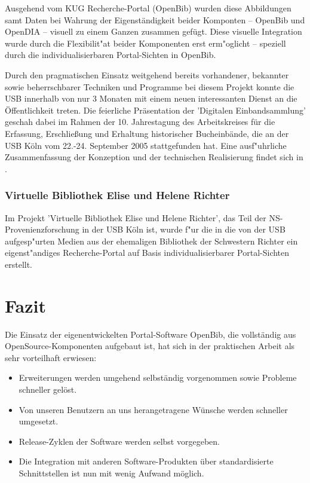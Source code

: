 \documentclass[11pt, twoside, a4paper, BCOR8mm, DIV12, bibtotoc,idxtotoc]{scrbook}
\begin{document}
\begin{itemize}
Ausgehend vom KUG Recherche-Portal (OpenBib) wurden diese Abbildungen
samt Daten bei Wahrung der Eigenständigkeit beider Komponten --
OpenBib und OpenDIA -- visuell zu einem Ganzen zusammen gefügt. Diese
visuelle Integration wurde durch die Flexibilit"at beider Komponenten
erst erm"oglicht -- speziell durch die individualisierbaren
Portal-Sichten in OpenBib. 

Durch den pragmatischen Einsatz weitgehend bereits vorhandener,
bekannter sowie beherrschbarer Techniken und Programme bei diesem
Projekt konnte die USB innerhalb von nur 3 Monaten mit einem neuen
interessanten Dienst an die Öffentlichkeit treten. Die feierliche
Präsentation der 'Digitalen Einbandsammlung' geschah dabei im Rahmen
der 10.  Jahrestagung des Arbeitskreises für die Erfassung,
Erschließung und Erhaltung historischer Bucheinbände, die an der USB
Köln vom 22.-24.  September 2005 stattgefunden hat.  Eine
ausf"uhrliche Zusammenfassung der Konzeption und der technischen
Realisierung findet sich in \cite{BoeFli:EinbandDB}.


\subsubsection{Virtuelle Bibliothek Elise und Helene Richter}

Im Projekt 'Virtuelle Bibliothek Elise und Helene Richter', das Teil
der NS-Provenienzforschung in der USB Köln ist, wurde f"ur die
in die von der USB aufgesp"urten Medien aus der ehemaligen Bibliothek
der Schwestern Richter ein eigenst"andiges Recherche-Portal auf Basis
individualisierbarer Portal-Sichten erstellt.

\section{Fazit}

Die Einsatz der eigenentwickelten Portal-Software OpenBib, die
vollständig aus OpenSource-Komponenten aufgebaut ist, hat sich in der
praktischen Arbeit als sehr vorteilhaft erwiesen:

\begin{itemize}
\item Erweiterungen werden umgehend selbständig vorgenommen sowie
  Probleme schneller gelöst.
\item Von unseren Benutzern an uns herangetragene Wünsche werden
  schneller umgesetzt.
\item Release-Zyklen der Software werden selbst vorgegeben.
\item Die Integration mit anderen Software-Produkten über
  standardisierte Schnittstellen ist nun mit wenig Aufwand möglich.
\end{itemize}
    

\end{itemize}
\end{document}
